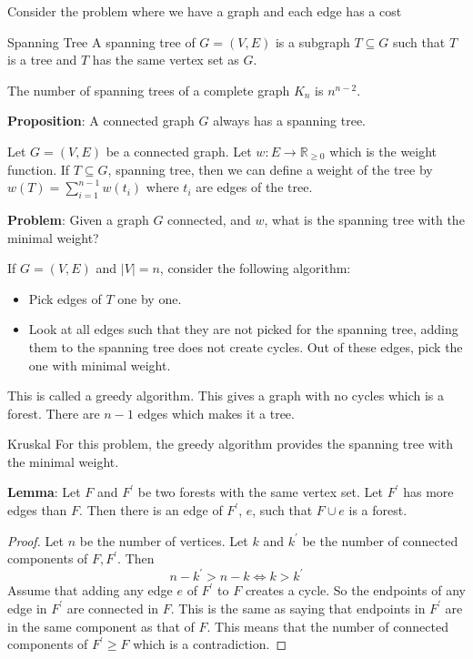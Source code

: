 \documentclass{report}
\begin{document}
Consider the problem where we have a graph and each edge has a cost

\begin{definition}{Spanning Tree}
    A spanning tree of $G = (V, E)$ is a subgraph $T \subseteq G$ such that $T$ is a tree and $T$ has the same vertex set as $G$.
\end{definition}

\begin{examples}
    \begin{example}
        The number of spanning trees of a complete graph $K_{n}$ is $n^{n - 2}$.
    \end{example}
\end{examples}

\textbf{Proposition}: A connected graph $G$ always has a spanning tree.

Let $G = (V, E)$ be a connected graph. Let $w : E \rightarrow \mathbb{R}_{\geq 0}$ which is the weight function. If $T \subseteq G$, spanning tree, then we can define a weight of the tree by $w(T) = \sum_{i = 1}^{n - 1}w(t_{i})$ where $t_{i}$ are edges of the tree. 

\textbf{Problem}: Given a graph $G$ connected, and $w$, what is the spanning tree with the minimal weight?

If $G = (V, E)$ and $\lvert V \rvert = n$, consider the following algorithm:
    \begin{itemize}
        \item Pick edges of $T$ one by one.

        \item Look at all edges such that they are not picked for the spanning tree, adding them to the spanning tree does not create cycles. Out of these edges, pick the one with minimal weight. 
    \end{itemize}
This is called a greedy algorithm. This gives a graph with no cycles which is a forest. There are $n - 1$ edges which makes it a tree.

\begin{theorem}{Kruskal}
    For this problem, the greedy algorithm provides the spanning tree with the minimal weight.
\end{theorem}

\textbf{Lemma}: Let $F$ and $F^{\prime}$ be two forests with the same vertex set. Let $F^{\prime}$ has more edges than $F$. Then there is an edge of $F^{\prime}$, $e$, such that $F \cup e$ is a forest.
    \begin{proof}
        Let $n$ be the number of vertices. Let $k$ and $k^{\prime}$ be the number of connected components of $F, F^{\prime}$. Then 
            \begin{equation*}
                n - k^{\prime} > n - k \iff k > k^{\prime}
            \end{equation*}
        Assume that adding any edge $e$ of $F^{\prime}$ to $F$ creates a cycle. So the endpoints of any edge in $F^{\prime}$ are connected in $F$. This is the same as saying that endpoints in $F^{\prime}$ are in the same component as that of $F$. This means that the number of connected components of $F^{\prime} \geq F$ which is a contradiction.
    \end{proof}
\end{document}
